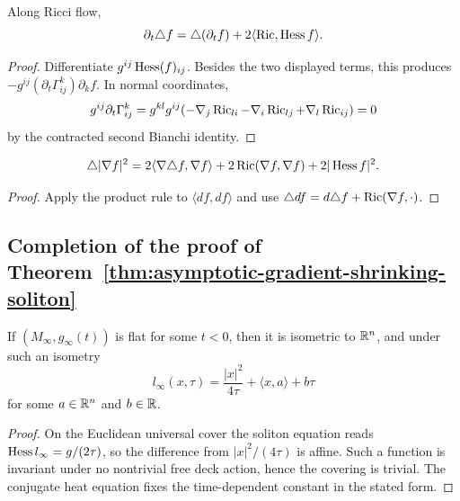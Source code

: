\begin{claim}\label{claim:laplacian-time-derivative-commutation}
\label{11.20}
Along Ricci flow,
\[
 \partial_t\triangle f=\triangle(\partial_tf)
 +2\langle\operatorname{Ric},\operatorname{Hess} f\rangle.
\]
\end{claim}
\begin{proof}
\sketch
{}
Differentiate $g^{ij}\operatorname{Hess}(f)_{ij}$. Besides the two displayed
terms, this produces
$-g^{ij}(\partial_t\Gamma^k_{ij})\partial_kf$. In normal
coordinates,
\[
 g^{ij}\partial_t\Gamma^k_{ij}
 =g^{kl}g^{ij}(-\nabla_j\operatorname{Ric}_{li}-\nabla_i\operatorname{Ric}_{lj}
 +\nabla_l\operatorname{Ric}_{ij})=0
\]
by the contracted second Bianchi identity.
\end{proof}

\begin{claim}\label{claim:laplacian-gradient-squared-formula}

\[
 \triangle|\nabla f|^2
 =2\langle\nabla\triangle f,\nabla f\rangle
 +2\operatorname{Ric}(\nabla f,\nabla f)+2|\operatorname{Hess} f|^2.
\]
\end{claim}
\begin{proof}
\sketch
{}
Apply the product rule to $\langle df,df\rangle$ and use
$\triangle df=d\triangle f+\operatorname{Ric}(\nabla f,\cdot)$.
\end{proof}

\subsection{Completion of the proof of
Theorem~{\ref{thm:asymptotic-gradient-shrinking-soliton}}}

\begin{claim}\label{claim:flat-limit-length-function-form}

If $(M_\infty,g_\infty(t))$ is flat for some $t<0$, then it is
isometric to $\mathbb{R}^n$, and under such an isometry
\[
 l_\infty(x,\tau)=\frac{|x|^2}{4\tau}+\langle x,a\rangle+b\tau
\]
for some $a\in\mathbb{R}^n$ and $b\in\mathbb{R}$.
\end{claim}
\begin{proof}
\sketch
{}
On the Euclidean universal cover the soliton equation reads
$\operatorname{Hess} l_\infty=g/(2\tau)$, so the difference from
$|x|^2/(4\tau)$ is affine. Such a function is invariant under no
nontrivial free deck action, hence the covering is trivial. The
conjugate heat equation fixes the time-dependent constant in the
stated form.
\end{proof}


